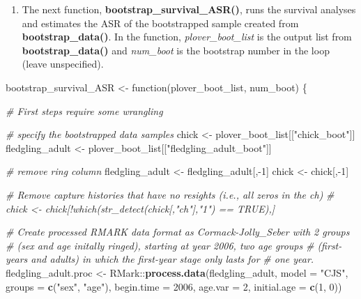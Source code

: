 \documentclass[]{article}
\newenvironment{Shaded}{\begin{snugshade}}{\end{snugshade}}
\newcommand{\KeywordTok}[1]{\textcolor[rgb]{0.13,0.29,0.53}{\textbf{{#1}}}}
\newcommand{\DataTypeTok}[1]{\textcolor[rgb]{0.13,0.29,0.53}{{#1}}}
\newcommand{\DecValTok}[1]{\textcolor[rgb]{0.00,0.00,0.81}{{#1}}}
\newcommand{\StringTok}[1]{\textcolor[rgb]{0.31,0.60,0.02}{{#1}}}
\newcommand{\CommentTok}[1]{\textcolor[rgb]{0.56,0.35,0.01}{\textit{{#1}}}}
\newcommand{\NormalTok}[1]{{#1}}
\providecommand{\tightlist}{%
  \setlength{\itemsep}{0pt}\setlength{\parskip}{0pt}}
\begin{document}
\begin{enumerate}
\def\labelenumi{\arabic{enumi})}
\setcounter{enumi}{1}
\tightlist
\item
  The next function, \textbf{bootstrap\_survival\_ASR()}, runs the
  survival analyses and estimates the ASR of the bootstrapped sample
  created from \textbf{bootstrap\_data()}. In the function,
  \emph{plover\_boot\_list} is the output list from
  \textbf{bootstrap\_data()} and \emph{num\_boot} is the bootstrap
  number in the loop (leave unspecified).
\end{enumerate}

\begin{Shaded}
\begin{Highlighting}[]
\NormalTok{bootstrap_survival_ASR <-}\StringTok{ }\NormalTok{function(plover_boot_list, num_boot) \{}
  
  \CommentTok{# First steps require some wrangling}
  
  \CommentTok{# specify the bootstrapped data samples}
  \NormalTok{chick <-}\StringTok{ }\NormalTok{plover_boot_list[[}\StringTok{"chick_boot"}\NormalTok{]]}
  \NormalTok{fledgling_adult <-}\StringTok{ }\NormalTok{plover_boot_list[[}\StringTok{"fledgling_adult_boot"}\NormalTok{]]}
  
  \CommentTok{# remove ring column}
  \NormalTok{fledgling_adult <-}\StringTok{ }\NormalTok{fledgling_adult[,-}\DecValTok{1}\NormalTok{]}
  \NormalTok{chick <-}\StringTok{ }\NormalTok{chick[,-}\DecValTok{1}\NormalTok{]}
  
            \CommentTok{# Remove capture histories that have no resights (i.e., all zeros in the ch)}
            \CommentTok{# chick <- chick[!which(str_detect(chick[,"ch"],"1") == TRUE),]}
  
  \CommentTok{# Create processed RMARK data format as Cormack-Jolly_Seber with 2 groups }
  \CommentTok{# (sex and age initally ringed), starting at year 2006, two age groups}
  \CommentTok{# (first-years and adults) in which the first-year stage only lasts for }
  \CommentTok{# one year.}
  \NormalTok{fledgling_adult.proc <-}\StringTok{ }\NormalTok{RMark::}\KeywordTok{process.data}\NormalTok{(fledgling_adult, }\DataTypeTok{model =} \StringTok{"CJS"}\NormalTok{,}
                                              \DataTypeTok{groups =} \KeywordTok{c}\NormalTok{(}\StringTok{"sex"}\NormalTok{, }\StringTok{"age"}\NormalTok{),}
                                              \DataTypeTok{begin.time =} \DecValTok{2006}\NormalTok{, }\DataTypeTok{age.var =} \DecValTok{2}\NormalTok{, }
                                              \DataTypeTok{initial.age =} \KeywordTok{c}\NormalTok{(}\DecValTok{1}\NormalTok{, }\DecValTok{0}\NormalTok{))}
  

\end{Highlighting}
\end{Shaded}
\end{document}
